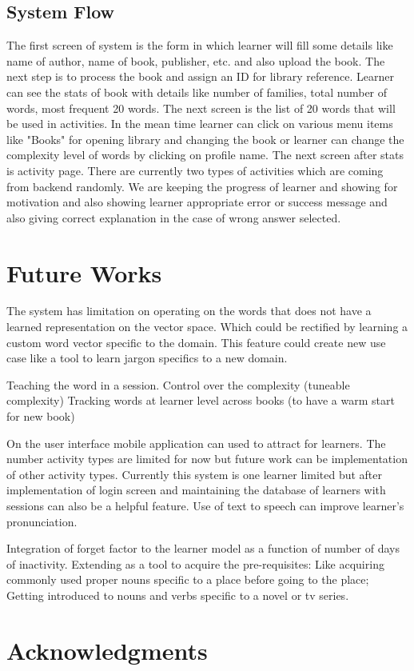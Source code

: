 \documentclass[11pt,a4paper]{article}
\begin{document}
\subsection{System Flow}
The first screen of system is the form in which learner will fill some details like name of author, name of book, publisher, etc. and also upload the book. The next step is to process the book and assign an ID for library reference. Learner can see the stats of book with details like number of families, total number of words, most frequent 20 words. 
The next screen is the list of 20 words that will be used in activities. In the mean time learner can click on various menu items like "Books" for opening library and changing the book or learner can change the complexity level of words by clicking on profile name. The next screen after stats is activity page. There are currently two types of activities which are coming from backend randomly. We are keeping the progress of learner and showing for motivation and also showing learner appropriate error or success message and also giving correct explanation in the case of wrong answer selected. 


\section{Future Works}
The system has limitation on operating on the words that does not have a learned
representation on the vector space. Which could be rectified by learning a
custom word vector specific to the domain. This feature could create new use case
like a tool to learn jargon specifics to a new domain.

Teaching the word in a session.
Control over the complexity (tuneable complexity)
Tracking words at learner level across books (to have a warm start for new book)

On the user interface mobile application can used to attract for learners. The number activity types are limited for now but future work can be implementation of other activity types. Currently this system is one learner limited but after implementation of login screen and maintaining the database of learners with sessions can also be a helpful feature. Use of text to speech can improve learner's pronunciation. 

Integration of forget factor to the learner model as a function of number of days of inactivity.
Extending as a tool to acquire the pre-requisites: Like acquiring commonly used proper nouns specific to a place before going to the place; Getting introduced to nouns and verbs specific to a novel or tv series.


\section*{Acknowledgments}



\end{document}
